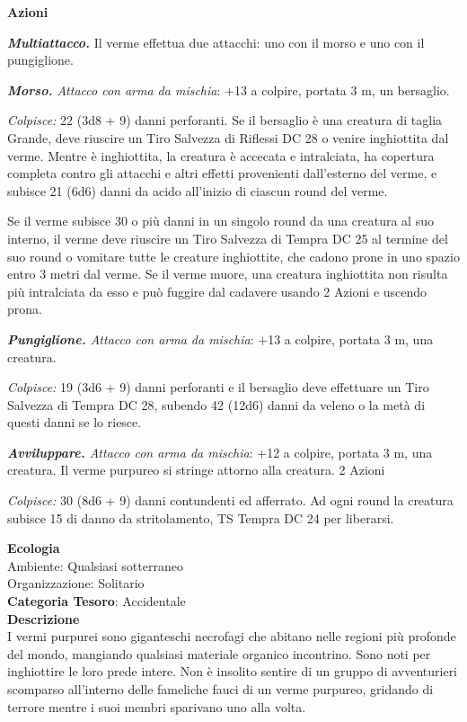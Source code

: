 \begin{multicols}{2}
{\textbf{Azioni}

\emph{\textbf{Multiattacco.}} Il verme effettua due attacchi: uno con il morso e uno con il pungiglione.

\emph{\textbf{Morso.} Attacco con arma da mischia}: +13 a colpire, portata 3 m, un bersaglio.

\emph{Colpisce:} 22 (3d8 + 9) danni perforanti. Se il bersaglio è una creatura di taglia Grande, deve riuscire un Tiro Salvezza di Riflessi DC 28 o venire inghiottita dal verme. Mentre è inghiottita, la creatura è accecata e intralciata, ha copertura completa contro gli attacchi e altri effetti provenienti dall'esterno del verme, e subisce 21 (6d6) danni da acido all'inizio di ciascun round del verme.

Se il verme subisce 30 o più danni in un singolo round da una creatura al suo interno, il verme deve riuscire un Tiro Salvezza di Tempra DC 25 al termine del suo round o vomitare tutte le creature inghiottite, che cadono prone in uno spazio entro 3 metri dal verme. Se il verme muore, una creatura inghiottita non risulta più intralciata da esso e può fuggire dal cadavere usando 2 Azioni e uscendo prona.

\emph{\textbf{Pungiglione.} Attacco con arma da mischia}: +13 a colpire, portata 3 m, una creatura.

\emph{Colpisce:} 19 (3d6 + 9) danni perforanti e il bersaglio deve effettuare un Tiro Salvezza di Tempra DC 28, subendo 42 (12d6) danni da veleno o la metà di questi danni se lo riesce.

\emph{\textbf{Avviluppare.} Attacco con arma da mischia}: +12 a colpire, portata 3 m, una creatura. Il verme purpureo si stringe attorno alla creatura. 2 Azioni

\emph{Colpisce:} 30 (8d6 + 9) danni contundenti ed afferrato. Ad ogni round la creatura subisce 15 di danno da stritolamento, TS Tempra DC 24 per liberarsi.

\textbf{Ecologia}\\
Ambiente: Qualsiasi sotterraneo\\
Organizzazione: Solitario\\
\textbf{Categoria Tesoro}: Accidentale\\
\textbf{Descrizione}\\
I vermi purpurei sono giganteschi necrofagi che abitano nelle regioni più profonde del mondo, mangiando qualsiasi materiale organico incontrino. Sono noti per inghiottire le loro prede intere. Non è insolito sentire di un gruppo di avventurieri scomparso all'interno delle fameliche fauci di un verme purpureo, gridando di terrore mentre i suoi membri sparivano uno alla volta.

}
\end{multicols}
